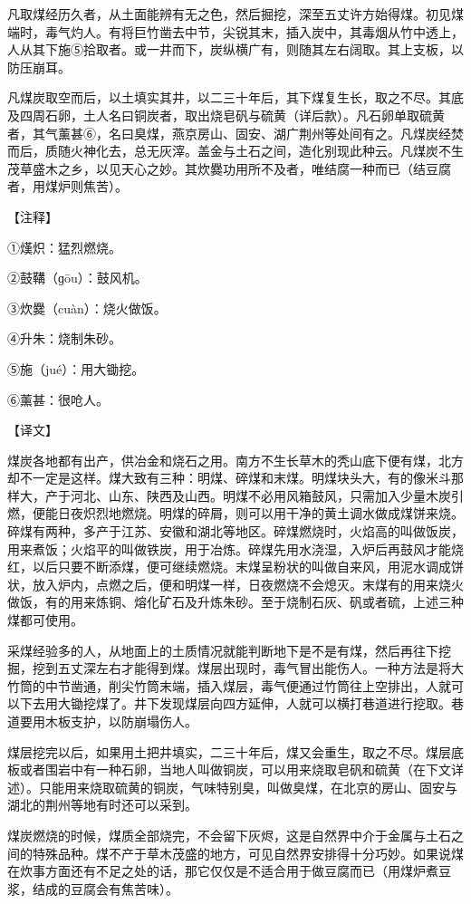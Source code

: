 \documentclass[12pt,UTF8]{ctexbook}
\begin{document}
凡取煤经历久者，从土面能辨有无之色，然后掘挖，深至五丈许方始得煤。初见煤端时，毒气灼人。有将巨竹凿去中节，尖锐其末，插入炭中，其毒烟从竹中透上，人从其下施⑤拾取者。或一井而下，炭纵横广有，则随其左右阔取。其上支板，以防压崩耳。

凡煤炭取空而后，以土填实其井，以二三十年后，其下煤复生长，取之不尽。其底及四周石卵，土人名曰铜炭者，取出烧皂矾与硫黄（详后款）。凡石卵单取硫黄者，其气薰甚⑥，名曰臭煤，燕京房山、固安、湖广荆州等处间有之。凡煤炭经焚而后，质随火神化去，总无灰滓。盖金与土石之间，造化别现此种云。凡煤炭不生茂草盛木之乡，以见天心之妙。其炊爨功用所不及者，唯结腐一种而已（结豆腐者，用煤炉则焦苦）。

【注释】

①熯炽：猛烈燃烧。

②鼓鞲（ɡōu）：鼓风机。

③炊爨（cuàn）：烧火做饭。

④升朱：烧制朱砂。

⑤施（jué）：用大锄挖。

⑥薰甚：很呛人。

【译文】

煤炭各地都有出产，供冶金和烧石之用。南方不生长草木的秃山底下便有煤，北方却不一定是这样。煤大致有三种：明煤、碎煤和末煤。明煤块头大，有的像米斗那样大，产于河北、山东、陕西及山西。明煤不必用风箱鼓风，只需加入少量木炭引燃，便能日夜炽烈地燃烧。明煤的碎屑，则可以用干净的黄土调水做成煤饼来烧。碎煤有两种，多产于江苏、安徽和湖北等地区。碎煤燃烧时，火焰高的叫做饭炭，用来煮饭；火焰平的叫做铁炭，用于冶炼。碎煤先用水浇湿，入炉后再鼓风才能烧红，以后只要不断添煤，便可继续燃烧。末煤呈粉状的叫做自来风，用泥水调成饼状，放入炉内，点燃之后，便和明煤一样，日夜燃烧不会熄灭。末煤有的用来烧火做饭，有的用来炼铜、熔化矿石及升炼朱砂。至于烧制石灰、矾或者硫，上述三种煤都可使用。

采煤经验多的人，从地面上的土质情况就能判断地下是不是有煤，然后再往下挖掘，挖到五丈深左右才能得到煤。煤层出现时，毒气冒出能伤人。一种方法是将大竹筒的中节凿通，削尖竹筒末端，插入煤层，毒气便通过竹筒往上空排出，人就可以下去用大锄挖煤了。井下发现煤层向四方延伸，人就可以横打巷道进行挖取。巷道要用木板支护，以防崩塌伤人。

煤层挖完以后，如果用土把井填实，二三十年后，煤又会重生，取之不尽。煤层底板或者围岩中有一种石卵，当地人叫做铜炭，可以用来烧取皂矾和硫黄（在下文详述）。只能用来烧取硫黄的铜炭，气味特别臭，叫做臭煤，在北京的房山、固安与湖北的荆州等地有时还可以采到。

煤炭燃烧的时候，煤质全部烧完，不会留下灰烬，这是自然界中介于金属与土石之间的特殊品种。煤不产于草木茂盛的地方，可见自然界安排得十分巧妙。如果说煤在炊事方面还有不足之处的话，那它仅仅是不适合用于做豆腐而已（用煤炉煮豆浆，结成的豆腐会有焦苦味）。
\end{document}
